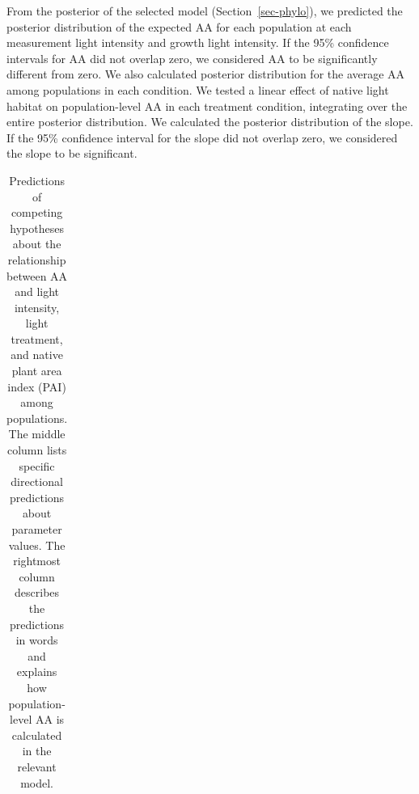 \documentclass[
  letterpaper,
  DIV=11,
  numbers=noendperiod]{scrartcl}
\newcommand{\aax}{$\mathrm{AA}$}
\begin{document}
From the posterior of the selected model (Section~\ref{sec-phylo}), we
predicted the posterior distribution of the expected \aax{} for each
population at each measurement light intensity and growth light
intensity. If the 95\% confidence intervals for \aax{} did not overlap
zero, we considered \aax{} to be significantly different from zero. We
also calculated posterior distribution for the average \aax{} among
populations in each condition. We tested a linear effect of native light
habitat on population-level \aax{} in each treatment condition,
integrating over the entire posterior distribution. We calculated the
posterior distribution of the slope. If the 95\% confidence interval for
the slope did not overlap zero, we considered the slope to be
significant.

\begin{longtable}{>{\raggedright\arraybackslash}p{1in}>{\raggedright\arraybackslash}p{1.5in}>{\raggedright\arraybackslash}p{3in}}

\caption{\label{tbl-predictions}Predictions of competing hypotheses
about the relationship between \aax{} and light intensity, light
treatment, and native plant area index (PAI) among populations. The
middle column lists specific directional predictions about parameter
values. The rightmost column describes the predictions in words and
explains how population-level \aax{} is calculated in the relevant
model.}

\tabularnewline


\end{longtable}
\end{document}
